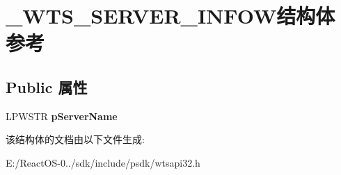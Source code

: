 \hypertarget{struct___w_t_s___s_e_r_v_e_r___i_n_f_o_w}{}\section{\+\_\+\+W\+T\+S\+\_\+\+S\+E\+R\+V\+E\+R\+\_\+\+I\+N\+F\+O\+W结构体 参考}
\label{struct___w_t_s___s_e_r_v_e_r___i_n_f_o_w}
\subsection*{Public 属性}
\begin{DoxyCompactItemize}
\item 
\mbox{\label{struct___w_t_s___s_e_r_v_e_r___i_n_f_o_w_a33be3c197cd4570b07fbf1c441d4f12a}} 
L\+P\+W\+S\+TR {\bfseries p\+Server\+Name}
\end{DoxyCompactItemize}


该结构体的文档由以下文件生成\+:\begin{DoxyCompactItemize}
\item 
E\+:/\+React\+O\+S-\/0../sdk/include/psdk/wtsapi32.\+h\end{DoxyCompactItemize}
